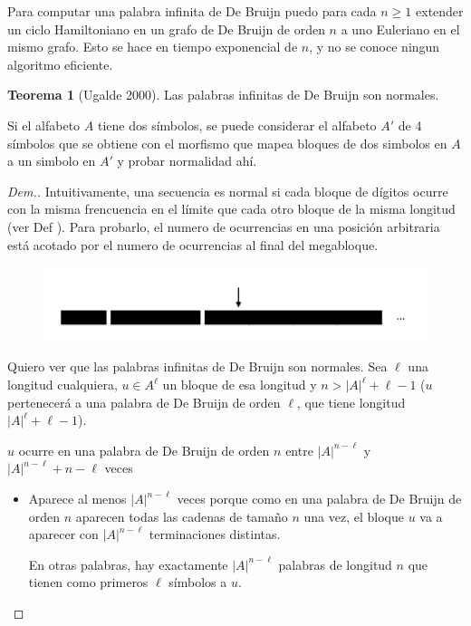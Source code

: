 \documentclass{report}
\theoremstyle{definition} %
\newtheorem{theorem}{Teorema}[chapter]
\begin{document}
Para computar una palabra infinita de De Bruijn puedo para cada $n \geq 1$
extender un ciclo Hamiltoniano en un grafo de De Bruijn de orden $n$ a uno
Euleriano en el mismo grafo. Esto se hace en tiempo exponencial de $n$, y no se
conoce ningun algoritmo eficiente.

\begin{theorem}[Ugalde 2000]
    Las palabras infinitas de De Bruijn son normales.

    Si el alfabeto $A$ tiene dos símbolos, se puede considerar el alfabeto $A'$
    de 4 símbolos que se obtiene con el morfismo que mapea bloques de dos
    simbolos en $A$ a un simbolo en $A'$ y probar normalidad ahí.
\end{theorem}
\begin{proof}[Dem.]
    Intuitivamente, una secuencia es normal si cada bloque de dígitos ocurre con
    la misma frencuencia en el límite que cada otro bloque de la misma longitud
    (ver Def ). Para probarlo, el numero de ocurrencias en
    una posición arbitraria está acotado por el numero de ocurrencias al final
    del megabloque.
    
    \begin{figure}[H]
        \centering
        \includegraphics[scale=0.3]{img/2_de_brujin_inf_normal_block.png}
    \end{figure}

    Quiero ver que las palabras infinitas de De Bruijn son normales. Sea $\ell$ una longitud cualquiera, $u \in A^\ell$ un bloque de esa longitud y $n > |A|^\ell + \ell - 1$ ($u$ pertenecerá a una palabra de De Bruijn de orden $\ell$, que tiene longitud $|A|^\ell + \ell - 1$).

    $u$ ocurre en una palabra de De Bruijn de orden $n$ entre $|A|^{n - \ell}$
    y $|A|^{n - \ell} + n - \ell$ veces
    \begin{itemize}
        \item Aparece al menos $|A|^{n - \ell}$ veces porque como en una palabra de De Bruijn de orden $n$ aparecen todas las cadenas de tamaño $n$ una vez, el bloque $u$ va a aparecer con $|A|^{n - \ell}$ terminaciones distintas.
        
        En otras palabras, hay exactamente $|A|^{n - \ell}$ palabras de longitud $n$ que tienen como primeros $\ell$ símbolos a $u$.


\end{itemize}
\end{proof}
\end{document}
